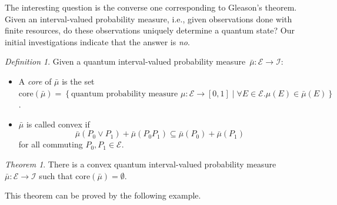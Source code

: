 \documentclass{article}
\theoremstyle{remark}
\newtheorem{definition}{Definition}
\newtheorem{thm}{Theorem}
\newcommand{\events}{\ensuremath{\mathcal{E}}}
\newcommand{\pmeas}{\ensuremath{\mu}}
\begin{document}
The interesting question is the converse one corresponding to
Gleason's theorem. Given an interval-valued probability measure, i.e.,
given observations done with finite resources, do these observations
uniquely determine a quantum state? Our initial investigations
indicate that the answer is \emph{no}.

\begin{definition}
  Given a quantum interval-valued probability
  measure~$\bar{\mu}:\events\rightarrow\mathscr{I}$:
\begin{itemize}
\item A \emph{core} of $\bar{\mu}$ is the set $\mathrm{core}\left(\bar{\mu}\right)=\left\{ \textrm{quantum probability measure }\pmeas:\events\rightarrow[0,1]\middle|\forall E\in\events.\pmeas\left(E\right)\in\bar{\mu}\left(E\right)\right\} $.
\item $\bar{\mu}$ is called convex if 
\begin{equation}
  \bar{\mu}\left(P_{0}\vee P_{1}\right)+\bar{\mu}\left(P_{0}P_{1}\right)\subseteq\bar{\mu}\left(P_{0}\right)+\bar{\mu}\left(P_{1}\right)\label{eq:QuantumInterval-valuedProbability-Convex}
\end{equation}
 for all commuting $P_{0},P_{1}\in\events$. 
\end{itemize}
\end{definition}

\begin{thm}\label{def:EmptyCoreQuantumInterval-valuedProbability}
There is a convex quantum interval-valued probability measure~$\bar{\mu}:\events\rightarrow\mathscr{I}$
such that $\mathrm{core}\left(\bar{\mu}\right)=\emptyset$.
\end{thm}

This theorem can be proved by the following example. 
\end{document}
